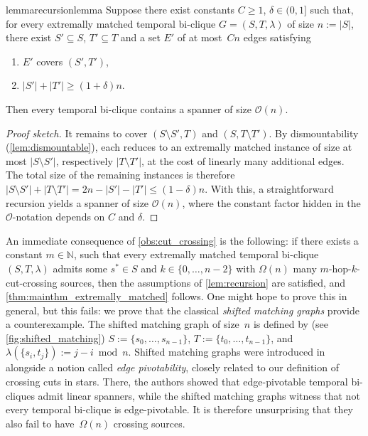 \documentclass[11pt, letterpaper]{article}
\newcommand{\bigO}{\mathcal{O}}
\renewcommand{\subset}{\subseteq}
\theoremstyle{definition}
\theoremstyle{plain}
\begin{document}
\begin{restatable}{lemma}{recursionlemma}
\label{lem:recursion}
Suppose there exist constants $C\geq 1$, $\delta \in (0,1]$ such that, for every extremally matched temporal bi-clique $G=(S,T,\lambda)$ of size $n:=|S|$, there exist $S'\subset S$, $T'\subset T$ and a set $E'$ of at most~$Cn$ edges satisfying
\begin{enumerate}[label=(\roman*)]
    \item $E'$ covers $(S',T')$,
    \item $|S'|+|T'|\geq (1+\delta) n$.
\end{enumerate}
Then every temporal bi-clique contains a spanner of size $\bigO(n)$.
\end{restatable}
\begin{proof}[Proof sketch]
It remains to cover $(S\setminus S',T)$ and $(S,T\setminus T')$. By dismountability (\cref{lem:dismountable}), each reduces to an extremally matched instance of size at most $|S\setminus S'|$, respectively $|T\setminus T'|$, at the cost of linearly many additional edges. The total size of the remaining instances is therefore $|S\setminus S'|+|T\setminus T'|=2n-|S'|-|T'|\leq (1-\delta)n$.
With this, a straightforward recursion yields a spanner of size $\bigO(n)$, where the constant factor hidden in the $\bigO$-notation depends on $C$ and $\delta$.
\end{proof}


An immediate consequence of \cref{obs:cut_crossing} is the following: if there exists a constant $m\in \mathbb{N}$, such that every extremally matched temporal bi-clique $(S,T,\lambda)$ admits some $s^*\in S$ and $k\in \{0, \dots, n-2\}$ with $\Omega(n)$ many $m$-hop-$k$-cut-crossing sources, then the assumptions of \cref{lem:recursion} are satisfied, and \cref{thm:mainthm_extremally_matched} follows.
One might hope to prove this in general, but this fails: we prove that the classical \emph{shifted matching graphs} provide a counterexample.
The shifted matching graph of size~$n$ is defined by (see \cref{fig:shifted_matching}) $S:=\{s_0, \dots, s_{n-1}\}$, $T:=\{t_0, \dots, t_{n-1}\}$, and ${\lambda(\{s_i,t_j\}):=j-i \bmod n}$.
Shifted matching graphs were introduced in \cite{Angrick24} alongside a notion called \emph{edge pivotability}, closely related to our definition of crossing cuts in stars. There, the authors showed that edge-pivotable temporal bi-cliques admit linear spanners, while the shifted matching graphs witness that not every temporal bi-clique is edge-pivotable. It is therefore unsurprising that they also fail to have~$\Omega(n)$ crossing sources.
\end{document}
